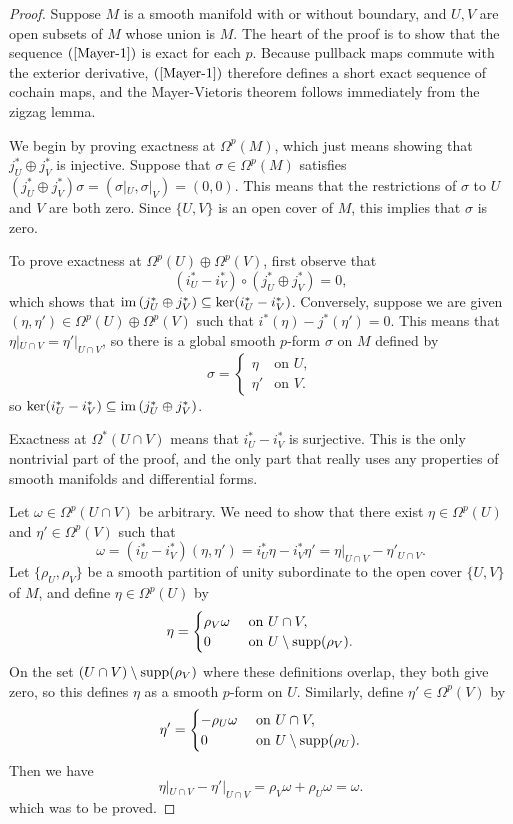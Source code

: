 \begin{proof}
Suppose $M$ is a smooth manifold with or without boundary, and $U,V$ are open subsets of $M$ whose union is $M$. The heart of the proof is to show that the sequence 
$(\ref{Mayer-1})$ is exact for each $p$. Because pullback maps commute with the exterior derivative, $(\ref{Mayer-1})$ therefore defines a short exact sequence of 
cochain maps, and the Mayer-Vietoris theorem follows immediately from the zigzag lemma.\par
We begin by proving exactness at $\Omega^p(M)$, which just means showing that $j_U^*\oplus j_V^*$ is injective. Suppose that $\sigma\in\Omega^p(M)$ satisfies 
$(j_U^*\oplus j_V^*)\sigma=(\sigma|_U,\sigma|_V)=(0,0)$. This means that the restrictions of $\sigma$ to $U$ and $V$ are both zero. Since $\{U,V\}$ is an open cover of 
$M$, this implies that $\sigma$ is zero.\par
To prove exactness at $\Omega^p(U)\oplus\Omega^p(V)$, first observe that
\[(i_U^*-i_V^*)\circ(j_U^*\oplus j_V^*)=0,\]
which shows that $\mathrm{im}\,(j_U^*\oplus j_V^*)\subseteq\ker(i_U^*-i_V^*)$. Conversely, suppose we are given $(\eta,\eta')\in\Omega^p(U)\oplus\Omega^p(V)$ such that 
$i^*(\eta)-j^*(\eta')=0$. This means that $\eta|_{U\cap V}=\eta'|_{U\cap V}$, so there is a global smooth $p$-form $\sigma$ on $M$ defined by
\[\sigma=\begin{cases}
\eta&\text{on }U,\\
\eta'&\text{on }V.
\end{cases}\]
so $\ker(i_U^*-i_V^*)\subseteq\mathrm{im}\,(j_U^*\oplus j_V^*)$.\par
Exactness at $\Omega^*(U\cap V)$ means that $i_U^*-i_V^*$ is surjective. This is the only nontrivial part of the proof, and the only part that really uses any properties of smooth manifolds and differential forms.\par
Let $\omega\in\Omega^p(U\cap V)$ be arbitrary. We need to show that there exist $\eta\in\Omega^p(U)$ and $\eta'\in\Omega^p(V)$ such that 
\[\omega=(i_U^*-i_V^*)(\eta,\eta')=i_U^*\eta-i_V^*\eta'=\eta|_{U\cap V}-\eta'_{U\cap V}.\]
Let $\{\rho_U,\rho_V\}$ be a smooth partition of unity subordinate to the open cover $\{U,V\}$ of $M$, and define $\eta\in\Omega^p(U)$ by
\[\eta=\begin{cases}
\rho_V\omega&\text{ on }U\cap V,\\
0&\text{ on }U\setminus\mathrm{supp}(\rho_V).
\end{cases}\]
On the set $(U\cap V)\setminus\mathrm{supp}(\rho_V)$ where these definitions overlap, they both give zero, so this defines $\eta$ as a smooth $p$-form on $U$. Similarly, define $\eta'\in\Omega^p(V)$ by
\[\eta'=\begin{cases}
-\rho_U\omega&\text{ on }U\cap V,\\
0&\text{ on }U\setminus\mathrm{supp}(\rho_U).
\end{cases}\]
Then we have
\[\eta|_{U\cap V}-\eta'|_{U\cap V}=\rho_V\omega+\rho_U\omega=\omega.\]
which was to be proved.
\end{proof}
